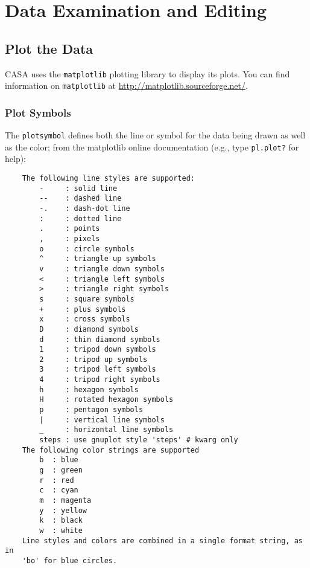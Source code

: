 

\chapter{Data Examination and Editing}
\label{chapter:edtool}

\section{Plot the Data}
\label{section:edtool.pl}

CASA uses the {\tt matplotlib} plotting library to display its plots.
You can find information on {\tt matplotlib} at
\url{http://matplotlib.sourceforge.net/}.

\subsection{Plot Symbols}
\label{section:edtool.pl.symb}

The {\tt plotsymbol} defines both the line or
symbol for the data being drawn as well as the color; from the
matplotlib online documentation (e.g., type {\tt pl.plot?} for help):

\small
\begin{verbatim}
    The following line styles are supported:
        -     : solid line
        --    : dashed line
        -.    : dash-dot line
        :     : dotted line
        .     : points
        ,     : pixels
        o     : circle symbols
        ^     : triangle up symbols
        v     : triangle down symbols
        <     : triangle left symbols
        >     : triangle right symbols
        s     : square symbols
        +     : plus symbols
        x     : cross symbols
        D     : diamond symbols
        d     : thin diamond symbols
        1     : tripod down symbols
        2     : tripod up symbols
        3     : tripod left symbols
        4     : tripod right symbols
        h     : hexagon symbols
        H     : rotated hexagon symbols
        p     : pentagon symbols
        |     : vertical line symbols
        _     : horizontal line symbols
        steps : use gnuplot style 'steps' # kwarg only
    The following color strings are supported
        b  : blue
        g  : green
        r  : red
        c  : cyan
        m  : magenta
        y  : yellow
        k  : black
        w  : white
    Line styles and colors are combined in a single format string, as in
    'bo' for blue circles.
\end{verbatim}
\normalsize

